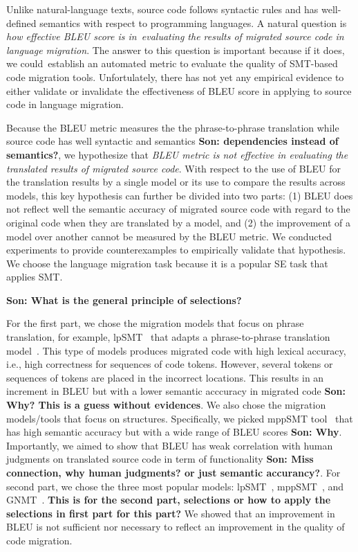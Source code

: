 Unlike natural-language texts, source code follows syntactic rules and
has well-defined semantics with respect to programming languages. A
natural question is {\em how effective BLEU score is in~evaluating the
  results of migrated source code in language migration}. The answer
to this question is important because if it does, we could~establish
an automated metric to evaluate the quality of SMT-based code
migration tools. 
Unfortulately, there has not yet
any empirical evidence to either validate or invalidate the
effectiveness of BLEU score in applying to source code in language
migration.

Because the BLEU metric measures the the phrase-to-phrase translation
while source code has well syntactic and semantics \textbf{Son: dependencies instead of semantics?}, we hypothesize
that {\em BLEU metric is not effective in evaluating the translated
  results of migrated source code}. With respect to the use of BLEU
for the translation results by a single model or its use to compare
the results across models, this key hypothesis can further be divided
into two parts: (1) BLEU does not reflect well the semantic accuracy
of migrated source code with regard to the original code when they are
translated by a model, and (2) the improvement of a model over another
cannot be measured by the BLEU metric.
%
We conducted experiments to provide counterexamples to empirically
validate that hypothesis. We choose the language migration task
because it is a popular SE task that applies SMT. 

\textbf{Son: What is the general principle of selections?}

For the first part, we chose the migration models that focus on phrase
translation, for example, lpSMT~\cite{fse13-nier} that adapts a
phrase-to-phrase translation model~\cite{phrasal10}. This type of
models produces migrated code with high lexical accuracy, i.e., high
correctness for sequences of code tokens. However, several tokens or
sequences of tokens are placed in the incorrect locations.  This
results in an increment in BLEU but with a lower semantic acccuracy in
migrated code \textbf{Son: Why? This is a guess without evidences}. We also chose the migration models/tools that focus on
structures. Specifically, we picked mppSMT tool~\cite{ase15} that has
high semantic accuracy but with a wide range of BLEU
scores \textbf{Son: Why}. Importantly, we aimed to show that BLEU has weak correlation
with human judgments on translated source code in term of
functionality \textbf{Son: Miss connection, why human judgments? or just semantic accurancy?}. 
For second part, we chose the three most popular
models: lpSMT~\cite{fse13-nier}, mppSMT~\cite{ase15}, and
GNMT~\cite{tien}. 
\textbf{This is for the second part, selections or how to apply the selections in first part for this part?} 
We showed that an improvement in BLEU is not
sufficient nor necessary to reflect an improvement in the quality of
code migration.

